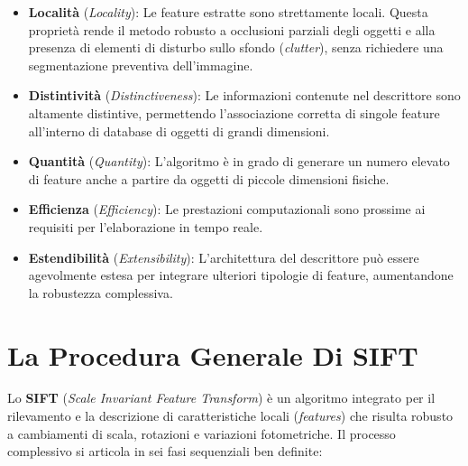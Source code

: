 ﻿\documentclass[11pt, a4paper]{article}
\begin{document}
\begin{itemize}
    \item \textbf{Località} (\emph{Locality}): Le feature estratte sono strettamente locali. Questa proprietà rende il metodo robusto a occlusioni parziali degli oggetti e alla presenza di elementi di disturbo sullo sfondo (\emph{clutter}), senza richiedere una segmentazione preventiva dell'immagine.
    \item \textbf{Distintività} (\emph{Distinctiveness}): Le informazioni contenute nel descrittore sono altamente distintive, permettendo l'associazione corretta di singole feature all'interno di database di oggetti di grandi dimensioni.
    \item \textbf{Quantità} (\emph{Quantity}): L'algoritmo è in grado di generare un numero elevato di feature anche a partire da oggetti di piccole dimensioni fisiche.
    \item \textbf{Efficienza} (\emph{Efficiency}): Le prestazioni computazionali sono prossime ai requisiti per l'elaborazione in tempo reale.
    \item \textbf{Estendibilità} (\emph{Extensibility}): L'architettura del descrittore può essere agevolmente estesa per integrare ulteriori tipologie di feature, aumentandone la robustezza complessiva.
\end{itemize}

\section{La Procedura Generale Di SIFT}

Lo \textbf{SIFT} (\emph{Scale Invariant Feature Transform}) è un algoritmo integrato per il rilevamento e la descrizione di caratteristiche locali (\emph{features}) che risulta robusto a cambiamenti di scala, rotazioni e variazioni fotometriche. Il processo complessivo si articola in sei fasi sequenziali ben definite:
\end{document}
